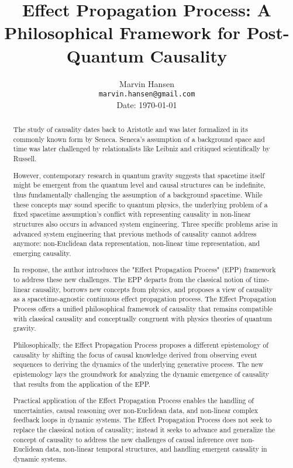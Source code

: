 \documentclass{article}
\title{Effect Propagation Process: A Philosophical Framework for Post-Quantum Causality}
\author{
  Marvin Hansen \\
  \texttt{marvin.hansen@gmail.com} \\
   Date: \today
}
\begin{document}
\maketitle

\begin{abstract}
The study of causality dates back to Aristotle and was later formalized in its commonly known form by Seneca. Seneca’s assumption of a background space and time was later challenged by relationalists like Leibniz and critiqued scientifically by Russell.

However, contemporary research in quantum gravity suggests that spacetime itself might be emergent from the quantum level and causal structures can be indefinite, thus fundamentally challenging the assumption of a background spacetime. While these concepts may sound specific to quantum physics, the underlying problem of a fixed spacetime assumption's conflict with representing causality in non-linear structures also occurs in advanced system engineering. Three specific problems arise in advanced system engineering that previous methods of causality cannot address anymore: non-Euclidean data representation, non-linear time representation, and emerging causality.\newline

In response, the author introduces the "Effect Propagation Process" (EPP) framework to address these new challenges. The EPP departs from the classical notion of time-linear causality, borrows new concepts from physics, and proposes a view of  causality as a spacetime-agnostic continuous effect propagation process. The Effect Propagation Process offers a unified philosophical framework of causality that remains compatible with classical causality and conceptually congruent with physics theories of quantum gravity.\newline

Philosophically, the Effect Propagation Process proposes a different epistemology of causality by shifting the focus of causal knowledge derived from observing event sequences to deriving the dynamics of the underlying generative process. The new epistemology lays the groundwork for analyzing the dynamic emergence of causality that results from the application of the EPP.\newline

Practical application of the Effect Propagation Process enables the handling of uncertainties, causal reasoning over non-Euclidean data, and non-linear complex feedback loops in dynamic systems. The Effect Propagation Process does not seek to replace the classical notion of causality; instead it seeks to advance and generalize the concept of causality to address the new challenges of causal inference over non-Euclidean data, non-linear temporal structures, and handling emergent causality in dynamic systems.
\end{abstract}
\end{document}
